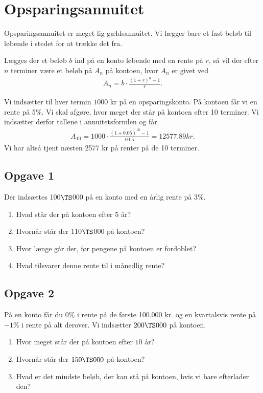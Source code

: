 \section*{Opsparingsannuitet}

Opsparingsannuitet er meget lig gældsannuitet. Vi lægger bare et fast beløb til løbende i stedet for at trække det fra. 

\begin{setn}[Opsparingsannuitet]
	Lægges der et beløb $b$ ind på en konto løbende med en rente på $r$, så vil der efter $n$ terminer være et 
	beløb på $A_n$ på kontoen, hvor $A_n$ er givet ved
	\begin{align*}
		A_n = b\cdot \frac{(1+r)^n-1}{r}.
	\end{align*}
\end{setn}

\begin{exa}
	Vi indsætter til hver termin $1000$ kr på en opsparingskonto. På kontoen får vi en rente på 5$\%$. Vi skal
	afgøre, hvor meget der står på kontoen efter 10 terminer. Vi indsætter derfor tallene i annuitetsformlen og får
	\begin{align*}
		A_{10} = 1000\cdot \frac{(1+0.05)^10-1}{0.05} = 12577.89kr.	
	\end{align*}	 
	Vi har altså tjent næsten 2577 kr på renter på de 10 terminer.  
\end{exa}


\subsection*{Opgave 1}
Der indsættes 100$\TS$000 på en konto med en årlig rente på $3\%$. 
\begin{enumerate}[label=\roman*)]
\item Hvad står der på kontoen efter 5 år?
\item Hvornår står der 110$\TS$000 på kontoen?
\item Hvor længe går der, før pengene på kontoen er fordoblet?
\item Hvad tilsvarer denne rente til i månedlig rente?
\end{enumerate}


\subsection*{Opgave 2}
På en konto får du $0\%$ i rente på de første 100.000 kr. og en kvartalsvis rente på $-1\%$ i rente på alt derover. Vi indsætter $200 \TS 000$ på kontoen.
\begin{enumerate}[label=\roman*)]
\item Hvor meget står der på kontoen efter $10$ år?
\item Hvornår står der $150 \TS 000$ på kontoen?
\item Hvad er det mindste beløb, der kan stå på kontoen, hvis vi bare efterlader den?
\end{enumerate}


